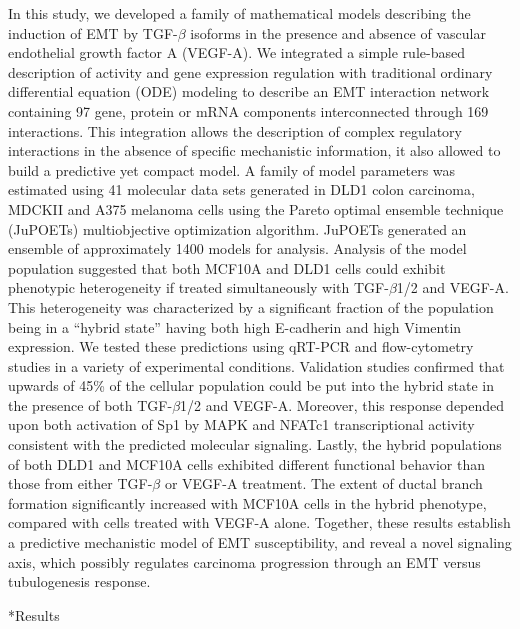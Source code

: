 \documentclass[12pt]{article}
\makeatletter
\renewcommand\section{\@startsection
	{subsection}{2}{0mm}
	{-0.2in}
	{0.05\baselineskip}
	{\normalfont\large\bfseries}}
\makeatother
\begin{document}
In this study, we developed a family of mathematical models describing the induction of EMT by TGF-$\beta$ isoforms in the presence and absence of vascular endothelial growth factor A (VEGF-A).
We integrated a simple rule-based description of activity and gene expression regulation with traditional ordinary differential equation (ODE) modeling to describe an EMT interaction network containing 97 gene, protein or mRNA components interconnected through 169 interactions.
This integration allows the description of complex regulatory interactions in the absence of specific mechanistic information, it also allowed to build a predictive yet compact model.
A family of model parameters was estimated using 41 molecular data sets generated in DLD1 colon carcinoma, MDCKII and A375 melanoma cells using the Pareto optimal ensemble technique (JuPOETs) multiobjective optimization algorithm.
JuPOETs generated an ensemble of approximately 1400 models for analysis.
Analysis of the model population suggested that both MCF10A and DLD1 cells could exhibit phenotypic heterogeneity if treated simultaneously with TGF-$\beta$1/2 and VEGF-A.
This heterogeneity was characterized by a significant fraction of the population being in a “hybrid state” having both high E-cadherin and high Vimentin expression.
We tested these predictions using qRT-PCR and flow-cytometry studies in a variety of experimental conditions.
Validation studies confirmed that upwards of 45\% of the cellular population could be put into the hybrid state in the presence of both TGF-$\beta$1/2 and VEGF-A.
Moreover, this response depended upon both activation of Sp1 by MAPK and NFATc1 transcriptional activity consistent with the predicted molecular signaling.
Lastly, the hybrid populations of both DLD1 and MCF10A cells exhibited different functional behavior than those from either TGF-$\beta$ or VEGF-A treatment.
The extent of ductal branch formation significantly increased with MCF10A cells in the hybrid phenotype, compared with cells treated with VEGF-A alone.
Together, these results establish a predictive mechanistic model of EMT susceptibility, and reveal a novel signaling axis, which possibly regulates carcinoma progression through an EMT versus tubulogenesis response.

\clearpage

\section*{Results}
\end{document}
